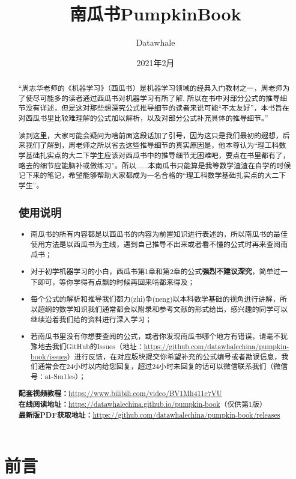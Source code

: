 \documentclass[UTF8]{ctexart}
\title{南瓜书PumpkinBook}
\author{Datawhale}
\date{2021年2月}
\numberwithin{figure}{section}
\numberwithin{table}{section}
\begin{document}
    \captionsetup[figure]{labelsep=space}
    \captionsetup[table]{labelsep=space}
    
    \thispagestyle{empty}
    \clearpage
    
    \section*{前言}
    \renewcommand{\abstractname}{}
    \begin{abstract}
        “周志华老师的《机器学习》（西瓜书）是机器学习领域的经典入门教材之一，周老师为了使尽可能多的读者通过西瓜书对机器学习有所了解, 所以在书中对部分公式的推导细节没有详述，但是这对那些想深究公式推导细节的读者来说可能“不太友好”，本书旨在对西瓜书里比较难理解的公式加以解析，以及对部分公式补充具体的推导细节。”
 
        读到这里，大家可能会疑问为啥前面这段话加了引号，因为这只是我们最初的遐想，后来我们了解到，周老师之所以省去这些推导细节的真实原因是，他本尊认为“理工科数学基础扎实点的大二下学生应该对西瓜书中的推导细节无困难吧，要点在书里都有了，略去的细节应能脑补或做练习”。所以......本南瓜书只能算是我等数学渣渣在自学的时候记下来的笔记，希望能够帮助大家都成为一名合格的“理工科数学基础扎实点的大二下学生”。
        \subsection*{使用说明}
        \begin{itemize}
            \item 南瓜书的所有内容都是以西瓜书的内容为前置知识进行表述的，所以南瓜书的最佳使用方法是以西瓜书为主线，遇到自己推导不出来或者看不懂的公式时再来查阅南瓜书；
            \item 对于初学机器学习的小白，西瓜书第1章和第2章的公式\textbf{强烈不建议深究}，简单过一下即可，等你学得有点飘的时候再回来啃都来得及；
            \item 每个公式的解析和推导我们都力(zhi)争(neng)以本科数学基础的视角进行讲解，所以超纲的数学知识我们通常都会以附录和参考文献的形式给出，感兴趣的同学可以继续沿着我们给的资料进行深入学习；
            \item 若南瓜书里没有你想要查阅的公式，或者你发现南瓜书哪个地方有错误，请毫不犹豫地去我们GitHub的Issues（地址：\url{https://github.com/datawhalechina/pumpkin-book/issues}）进行反馈，在对应版块提交你希望补充的公式编号或者勘误信息，我们通常会在24小时以内给您回复，超过24小时未回复的话可以微信联系我们（微信号：at-Sm1les）；
        \end{itemize}
        \textbf{配套视频教程：}\url{https://www.bilibili.com/video/BV1Mh411e7VU}\\
        \textbf{在线阅读地址：}\url{https://datawhalechina.github.io/pumpkin-book}（仅供第1版）\\
        \textbf{最新版PDF获取地址：}\url{https://github.com/datawhalechina/pumpkin-book/releases}

\end{abstract}
\end{document}
